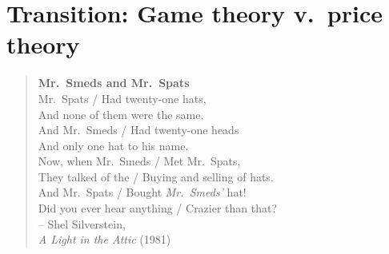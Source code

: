 \chapter{Transition: Game theory v.\ price theory}
\label{2transition}



\begin{quote}
\hspace*{2cm}\large{\textbf{Mr.\ Smeds and Mr.\ Spats}}\\[.2cm]
\hspace*{1cm}Mr.\ Spats / Had twenty-one hats,\\[.03cm]
\hspace*{1cm}And none of them were the same. \\[.03cm]
\hspace*{1cm}And Mr.\ Smeds / Had twenty-one heads \\[.03cm]
\hspace*{1cm}And only one hat to his name.\\[.1cm]
\hspace*{1cm}Now, when Mr.\ Smeds / Met Mr.\ Spats,\\[.03cm]
\hspace*{1cm}They talked of the / Buying and selling of hats.\\[.03cm]
\hspace*{1cm}And Mr.\ Spats / Bought \emph{Mr.\ Smeds'} hat!\\[.03cm]
\hspace*{1cm}Did you ever hear anything / Crazier than that?\\[.03cm]
\hspace*{2cm}-- Shel Silverstein,\\[.03cm]
\hspace*{2cm}\emph{A Light in the Attic} (1981)
\end{quote}

